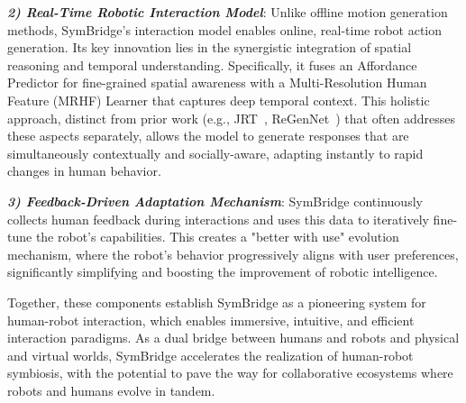 \noindent\textit{\textbf{2) Real-Time Robotic Interaction Model}}:
Unlike offline motion generation methods, SymBridge's interaction model enables online, real-time robot action generation. Its key innovation lies in the synergistic integration of spatial reasoning and temporal understanding. Specifically, it fuses an Affordance Predictor for fine-grained spatial awareness with a Multi-Resolution Human Feature (MRHF) Learner that captures deep temporal context. This holistic approach, distinct from prior work (e.g., JRT~\cite{xu2023joint}, ReGenNet~\cite{xu2024regennet}) that often addresses these aspects separately, allows the model to generate responses that are simultaneously contextually and socially-aware, adapting instantly to rapid changes in human behavior.

\noindent\textit{\textbf{3) Feedback-Driven Adaptation Mechanism}}:
SymBridge continuously collects human feedback during interactions and uses this data to iteratively fine-tune the robot’s capabilities. This creates a "better with use" evolution mechanism, where the robot’s behavior progressively aligns with user preferences, significantly simplifying and boosting the improvement of robotic intelligence.

\noindent Together, these components establish SymBridge as a pioneering system for human-robot interaction, %
which enables immersive, intuitive, and efficient interaction paradigms.
As a dual bridge between humans and robots and physical and virtual worlds, SymBridge accelerates the realization of human-robot symbiosis, with the potential to pave the way for collaborative ecosystems where robots and humans evolve in tandem.



